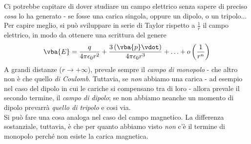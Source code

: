 \begin{observe}
	Ci potrebbe capitare di dover studiare un campo elettrico senza sapere di preciso \textit{cosa} lo ha generato - se fosse una carica singola, oppure un dipolo, o un tripolo... Per capire meglio, si può sviluppare in serie di Taylor rispetto a $\frac{1}{r}$ il campo elettrico, in modo da ottenere una scrittura del genere
	\begin{equation*}
		\vba{E}=\frac{q}{4\pi \epsilon_0 r^2}+\frac{3\left(\vba{p}\vdot \right)}{4\pi\epsilon_0r^3}+\ldots+o\left(\frac{1}{r^n}\right)
	\end{equation*}
	A grandi distanze ($r\to+\infty$), prevale sempre il \textit{campo di monopolo} - che altro non è che quello \textit{di Coulomb}. Tuttavia, se \textit{non} abbiamo una carica - ad esempio nel caso del dipolo in cui le cariche si compensano tra di loro - allora prevale il secondo termine, il \textit{campo di dipolo}; se non abbiamo neanche un momento di dipolo prevarrà \textit{quello di tripolo} e cosi via.\\
	Si può fare una cosa analoga nel caso del campo magnetico. La differenza sostanziale, tuttavia, è che per quanto abbiamo visto \textit{non} c'è il termine di monopolo perché non esiste la carica magnetica.
\end{observe}
